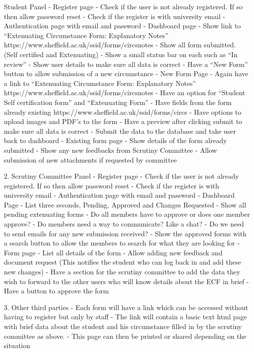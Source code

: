 \documentclass[../main.tex]{subfiles}
\begin{document}
Student Panel
	- Register page
		- Check if the user is not already registered. If so then allow password reset
		- Check if the register is with university email
	- Authentication page with email and password
	- Dashboard page
		- Show link to “Extenuating Circumstance Form: Explanatory Notes”
			https://www.sheffield.ac.uk/ssid/forms/circsnotes
		- Show all form submitted. (Self certified and Extenuating)
			- Show a small status bar on each such as “In review”
		- Show user details to make sure all data is correct 
		- Have a “New Form” button to allow submission of a new circumstance
	- New Form Page
		- Again have a link to “Extenuating Circumstance Form: Explanatory Notes”
			https://www.sheffield.ac.uk/ssid/forms/circsnotes
		- Have an option for “Student Self certification form” and “Extenuating Form”
		- Have fields from the form already existing 
			https://www.sheffield.ac.uk/ssid/forms/circs
		- Have options to upload images and PDF’s to the form 
		- Have a preview after clicking submit to make sure all data is correct
		- Submit the data to the database and take user back to dashboard
	- Existing form page
		- Show details of the form already submitted
		- Show any new feedbacks from Scrutiny Committee 
		- Allow submission of new attachments if requested by committee
	
2. Scrutiny Committee Panel
	- Register page
		- Check if the user is not already registered. If so then allow password reset
		- Check if the register is with university email
	- Authentication page with email and password
	- Dashboard Page
		- List three seconds, Pending, Approved and Changes Requested
			- Show all pending extenuating forms 
				- Do all members have to approve or does one member approve?
				- Do members need a way to communicate? Like a chat?
				- Do we need to send emails for any new submission received?
			- Show the approved forms with a search button to allow the members to 				   search for what they are looking for 
	- Form page
		- List all details of the form
		- Allow adding new feedback and document request (This notifies the student who 			   can log back in and add these new changes)
		- Have a section for the scrutiny committee to add the data they wish to forward to          		  the other users who will know details about the ECF in brief 
		- Have a button to approve the form 

3. Other third parties 
	- Each form will have a link which can be accessed without having to register but only by 		  staff
	- The link will contain a basic text html page with brief data about the student and his 			 circumstance filled in by the scrutiny committee as above. 
	- This page can then be printed or shared depending on the situation   
\end{document}
